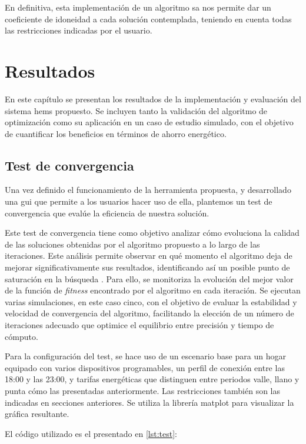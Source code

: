 \documentclass[11pt,a4paper]{book}
\begin{document}
En definitiva, esta implementación de un algoritmo \gls{sa} nos permite dar un coeficiente de idoneidad a cada solución contemplada, teniendo en cuenta todas las restricciones indicadas por el usuario.

\chapter{Resultados}
En este capítulo se presentan los resultados de la implementación y evaluación del sistema \gls{hems} propuesto. Se incluyen tanto la validación del algoritmo de optimización como su aplicación en un caso de estudio simulado, con el objetivo de cuantificar los beneficios en términos de ahorro energético.
\section{Test de convergencia}
Una vez definido el funcionamiento de la herramienta propuesta, y desarrollado una \gls{gui} que permite a los usuarios hacer uso de ella, plantemos un test de convergencia que evalúe la eficiencia de nuestra solución.

Este test de convergencia tiene como objetivo analizar cómo evoluciona la calidad de las soluciones obtenidas por el algoritmo propuesto a lo largo de las iteraciones. Este análisis permite observar en qué momento el algoritmo deja de mejorar significativamente sus resultados, identificando así un posible punto de saturación en la búsqueda \cite{keepcoding2023convergencia}. Para ello, se monitoriza la evolución del mejor valor de la función de \textit{fitness} encontrado por el algoritmo en cada iteración. Se ejecutan varias simulaciones, en este caso cinco, con el objetivo de evaluar la estabilidad y velocidad de convergencia del algoritmo, facilitando la elección de un número de iteraciones adecuado que optimice el equilibrio entre precisión y tiempo de cómputo. 

Para la configuración del test, se hace uso de un escenario base para un hogar equipado con varios dispositivos programables, un perfil de conexión entre las 18:00 y las 23:00, y tarifas energéticas que distinguen entre periodos valle, llano y punta cómo las presentadas anteriormente. Las restricciones también son las indicadas en secciones anteriores. Se utiliza la librería matplot para visualizar la gráfica resultante. 

El código utilizado es el presentado en \autoref{lst:test}:
\end{document}
